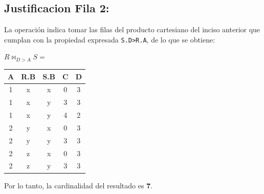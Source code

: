 \subsection*{Justificacion Fila 2:}

La operación indica tomar las filas del producto cartesiano del inciso anterior que cumplan con la propiedad expresada \texttt{S.D>R.A}, de lo que se obtiene:

\begin{center}
$R \bowtie_{D > A} S =$ \quad
\begin{tabular}{|c|c|c|c|c|}
\hline
\textbf{A} & \textbf{R.B} & \textbf{S.B} & \textbf{C} & \textbf{D} \\ \hline
  1 & x & x & 0 & 3 \\
  1 & x & y & 3 & 3 \\
  1 & x & y & 4 & 2 \\
  2 & y & x & 0 & 3 \\
  2 & y & y & 3 & 3 \\
  2 & z & x & 0 & 3 \\
  2 & z & y & 3 & 3 \\ \hline
\end{tabular}
\end{center}

Por lo tanto, la cardinalidad del resultado es \textbf{7}.